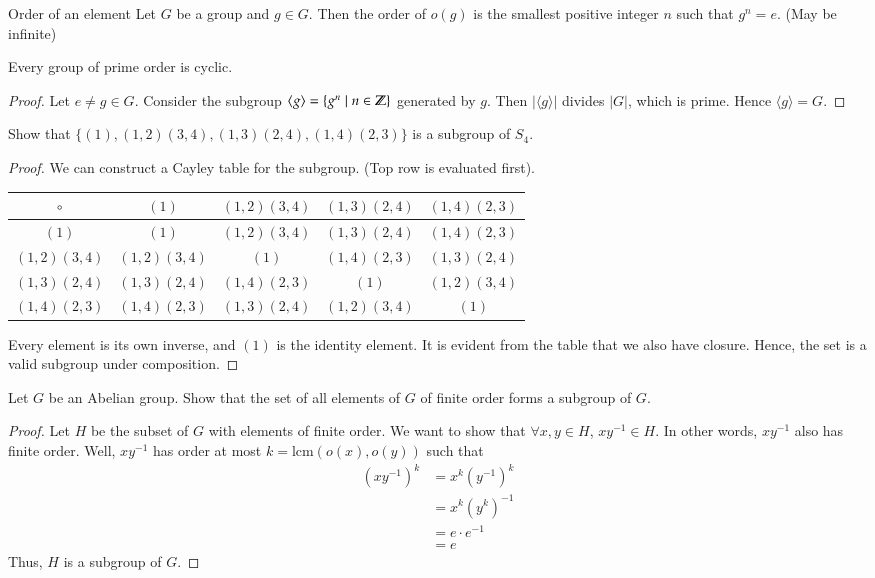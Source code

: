 \begin{defn}{Order of an element}
Let $G$ be a group and $g\in G$. Then the order of $o(g)$ is the smallest positive integer $n$ such that $g^n=e$. (May be infinite)
\end{defn}

\begin{proposition}
	Every group of prime order is cyclic. 
\end{proposition}
\begin{proof}
Let $e\neq g\in G$. Consider the subgroup $\langle g \rangle =\{g^n\mid n\in \mathbb{Z}\}$ generated by $g$. Then $|\langle g \rangle|$ divides $|G|$, which is prime. Hence $\langle g \rangle = G$. 
\end{proof}

Show that $\{(1), (1, 2)(3, 4), (1, 3)(2, 4), (1, 4)(2, 3)\}$ is a subgroup of $S_4$. 

\begin{proof}
We can construct a Cayley table for the subgroup. (Top row is evaluated first). 

\begin{center}
\begin{tabular}{c|cccc}
$\circ$        & $(1)$          & $(1, 2)(3, 4)$ & $(1, 3)(2, 4)$ & $(1, 4)(2, 3)$ \\ \hline
$(1)$          & $(1)$          & $(1, 2)(3, 4)$ & $(1, 3)(2, 4)$ & $(1, 4)(2, 3)$ \\
$(1, 2)(3, 4)$ & $(1, 2)(3, 4)$ & $(1)$          & $(1, 4)(2, 3)$ & $(1, 3)(2, 4)$ \\
$(1, 3)(2, 4)$ & $(1, 3)(2, 4)$ & $(1, 4)(2, 3)$ & $(1)$          & $(1, 2)(3, 4)$ \\
$(1, 4)(2, 3)$ & $(1, 4)(2, 3)$ & $(1, 3)(2, 4)$ & $(1, 2)(3, 4)$ & $(1)$         
\end{tabular}
\end{center}

Every element is its own inverse, and $(1)$ is the identity element. It is evident from the table that we also have closure. Hence, the set is a valid subgroup under composition. 
\end{proof}

Let $G$ be an Abelian group. Show that the set of all elements of $G$ of finite order forms a subgroup of $G$. 

\begin{proof}
Let $H$ be the subset of $G$ with elements of finite order. We want to show that $\forall x, y\in H$, $xy^{-1}\in H$. In other words, $xy^{-1}$ also has finite order. Well, $xy^{-1}$ has order at most $k=\mathrm{lcm}(o(x), o(y))$ such that 
\begin{align*}
	(xy^{-1})^k &= x^k (y^{-1})^k \\
	&= x^k (y^k)^{-1} \\
	&= e\cdot e^{-1} \\
	&= e
\end{align*}
Thus, $H$ is a subgroup of $G$. 
\end{proof}

